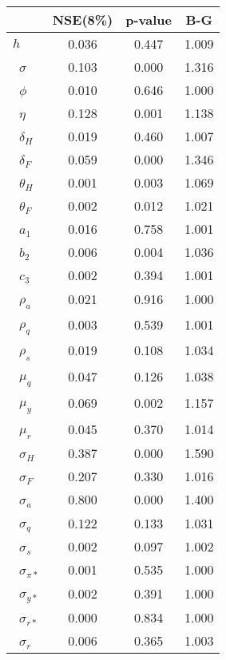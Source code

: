 \begin{tiny}\begin{tabular}{lccc}
\hline
&\textbf{NSE(8\%)}&\textbf{p-value}&\textbf{B-G}\\\hline
\textbf{$ h             $}&0.036&0.447&1.009\\\
\textbf{$ \sigma        $}&0.103&0.000&1.316\\\
\textbf{$ \phi          $}&0.010&0.646&1.000\\\
\textbf{$ \eta          $}&0.128&0.001&1.138\\\
\textbf{$ \delta_{H}    $}&0.019&0.460&1.007\\\
\textbf{$ \delta_{F}    $}&0.059&0.000&1.346\\\
\textbf{$ \theta_{H}    $}&0.001&0.003&1.069\\\
\textbf{$ \theta_{F}    $}&0.002&0.012&1.021\\\
\textbf{$ a_{1}         $}&0.016&0.758&1.001\\\
\textbf{$ b_{2}         $}&0.006&0.004&1.036\\\
\textbf{$ c_{3}         $}&0.002&0.394&1.001\\\
\textbf{$ \rho_{a}      $}&0.021&0.916&1.000\\\
\textbf{$ \rho_{q}      $}&0.003&0.539&1.001\\\
\textbf{$ \rho_{s}      $}&0.019&0.108&1.034\\\
\textbf{$ \mu_{q}       $}&0.047&0.126&1.038\\\
\textbf{$ \mu_{y}       $}&0.069&0.002&1.157\\\
\textbf{$ \mu_{r}       $}&0.045&0.370&1.014\\\
\textbf{$ \sigma_{H}    $}&0.387&0.000&1.590\\\
\textbf{$ \sigma_{F}    $}&0.207&0.330&1.016\\\
\textbf{$ \sigma_{a}    $}&0.800&0.000&1.400\\\
\textbf{$ \sigma_{q}    $}&0.122&0.133&1.031\\\
\textbf{$ \sigma_{s}    $}&0.002&0.097&1.002\\\
\textbf{$ \sigma_{\pi*} $}&0.001&0.535&1.000\\\
\textbf{$ \sigma_{y*}   $}&0.002&0.391&1.000\\\
\textbf{$ \sigma_{r*}   $}&0.000&0.834&1.000\\\
\textbf{$ \sigma_{r}    $}&0.006&0.365&1.003\\\hline
\end{tabular}
\end{tiny}